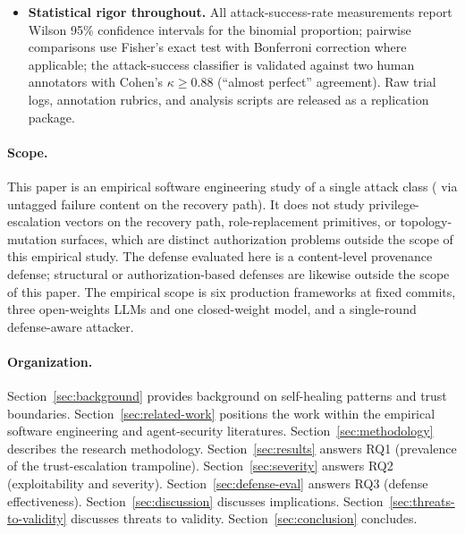 \begin{itemize}[leftmargin=*]
    \item \textbf{Statistical rigor throughout.} All attack-success-rate measurements report Wilson 95\% confidence intervals for the binomial proportion; pairwise comparisons use Fisher's exact test with Bonferroni correction where applicable; the attack-success classifier is validated against two human annotators with Cohen's $\kappa \geq 0.88$ (``almost perfect'' agreement). Raw trial logs, annotation rubrics, and analysis scripts are released as a replication package.
\end{itemize}

\paragraph{Scope.}
This paper is an empirical software engineering study of a single attack class (\rci{} via untagged failure content on the recovery path). It does not study privilege-escalation vectors on the recovery path, role-replacement primitives, or topology-mutation surfaces, which are distinct authorization problems outside the scope of this empirical study. The defense evaluated here is a content-level provenance defense; structural or authorization-based defenses are likewise outside the scope of this paper. The empirical scope is six production frameworks at fixed commits, three open-weights LLMs and one closed-weight model, and a single-round defense-aware attacker.

\paragraph{Organization.}
Section~\ref{sec:background} provides background on self-healing patterns and trust boundaries. Section~\ref{sec:related-work} positions the work within the empirical software engineering and agent-security literatures. Section~\ref{sec:methodology} describes the research methodology. Section~\ref{sec:results} answers RQ1 (prevalence of the trust-escalation trampoline). Section~\ref{sec:severity} answers RQ2 (exploitability and severity). Section~\ref{sec:defense-eval} answers RQ3 (defense effectiveness). Section~\ref{sec:discussion} discusses implications. Section~\ref{sec:threats-to-validity} discusses threats to validity. Section~\ref{sec:conclusion} concludes.
